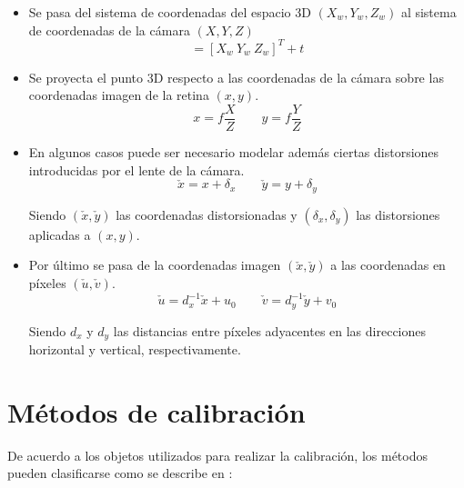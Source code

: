 \begin{itemize}
\item Se pasa del sistema de coordenadas del espacio 3D $(X_w, Y_w, Z_w)$ al sistema de coordenadas de la cámara $(X,Y, Z)$
\begin{equation}
[X \ Y \ Z] = [X_w \ Y_w \ Z_w]^T + t
\end{equation}
\item Se proyecta el punto 3D respecto a las coordenadas de la cámara sobre las coordenadas imagen de la retina $(x,y)$.
\begin{equation}
x=f \dfrac{X}{Z} \qquad y = f\dfrac{Y}{Z}
\end{equation}
\item En algunos casos puede ser necesario modelar además ciertas distorsiones introducidas por el lente de la cámara.
\begin{equation}
\check{x} = x + \delta_x \qquad \check{y} = y + \delta_y
\end{equation}

Siendo $(\check{x},\check{y})$ las coordenadas distorsionadas y $(\delta_x, \delta_y)$ las distorsiones aplicadas a $(x,y)$.

\item Por último se pasa de la coordenadas imagen $(\check{x}, \check{y})$ a las coordenadas en píxeles $(\check{u}, \check{v})$.
\vspace{-0.05cm}
\begin{equation}
\check{u} = d_x ^{-1}\check{x} + u_0 \qquad \check{v} = d_y ^{-1}\check{y} + v_0
\end{equation}

Siendo $d_x$ y $d_y$ las distancias entre píxeles adyacentes en las direcciones horizontal y vertical, respectivamente.
\end{itemize}


\section{Métodos de calibración}

De acuerdo a los objetos utilizados para realizar la calibración, los métodos pueden clasificarse como se describe en \cite{zhang_libro}:

